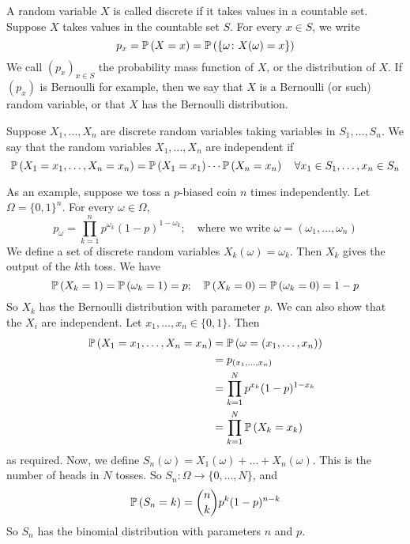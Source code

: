 \begin{definition}
	A random variable \(X\) is called discrete if it takes values in a countable set.
	Suppose \(X\) takes values in the countable set \(S\).
	For every \(x \in S\), we write
	\[
		p_x = \mathbb{P}\left({X = x}\right) = \mathbb{P}\left({\{ \omega \colon X(\omega) = x \}}\right)
	\]
	We call \((p_x)_{x \in S}\) the probability mass function of \(X\), or the distribution of \(X\).
	If \((p_x)\) is Bernoulli for example, then we say that \(X\) is a Bernoulli (or such) random variable, or that \(X\) has the Bernoulli distribution.
\end{definition}
\begin{definition}
	Suppose \(X_1, \dots, X_n\) are discrete random variables taking variables in \(S_1, \dots, S_n\).
	We say that the random variables \(X_1, \dots, X_n\) are independent if
	\[
		\mathbb{P}\left({X_1 = x_1, \dots, X_n = x_n}\right) = \mathbb{P}\left({X_1 = x_1}\right) \cdots \mathbb{P}\left({X_n = x_n}\right)\quad \forall x_1 \in S_1, \dots, x_n \in S_n
	\]
\end{definition}
As an example, suppose we toss a \(p\)-biased coin \(n\) times independently.
Let \(\Omega = \{ 0, 1 \}^n\).
For every \(\omega \in \Omega\),
\[
	p_\omega = \prod_{k=1}^n p^{\omega_k} (1-p)^{1-\omega_k};\quad \text{where we write } \omega = (\omega_1, \dots, \omega_n)
\]
We define a set of discrete random variables \(X_k(\omega) = \omega_k\).
Then \(X_k\) gives the output of the \(k\)th toss.
We have
\[
	\mathbb{P}\left({X_k = 1}\right) = \mathbb{P}\left({\omega_k = 1}\right) = p;\quad \mathbb{P}\left({X_k = 0}\right) = \mathbb{P}\left({\omega_k = 0}\right) = 1-p
\]
So \(X_k\) has the Bernoulli distribution with parameter \(p\).
We can also show that the \(X_i\) are independent.
Let \(x_1, \dots, x_n \in \{ 0, 1 \}\).
Then
\begin{align*}
	\mathbb{P}\left({X_1 = x_1, \dots, X_n = x_n}\right) & = \mathbb{P}\left({\omega = (x_1, \dots, x_n)}\right)   \\
	                                   & = p_{(x_1, \dots, x_n)}               \\
	                                   & = \prod_{k=1}^N p^{x_k} (1-p)^{1-x_k} \\
	                                   & = \prod_{k=1}^N \mathbb{P}\left({X_k = x_k}\right)
\end{align*}
as required.
Now, we define \(S_n(\omega) = X_1(\omega) + \dots + X_n(\omega)\).
This is the number of heads in \(N\) tosses.
So \(S_n \colon \Omega \to \{ 0, \dots, N \}\), and
\[
	\mathbb{P}\left({S_n = k}\right) = \binom{n}{k} p^k (1-p)^{n-k}
\]
So \(S_n\) has the binomial distribution with parameters \(n\) and \(p\).

